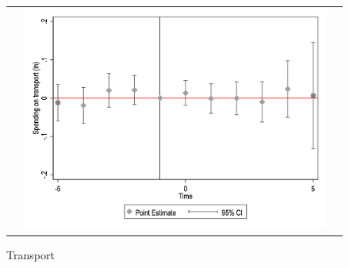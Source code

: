 \begin{figure}[!ht]
\begin{tabular}{@{}ccc@{}}
\begin{minipage}[t]{0.32\textwidth}
            \label{fig:cassport}
        \end{minipage} &
        \begin{minipage}[t]{0.32\textwidth}
            \centering
            \caption{Transport}
            \includegraphics[width=\linewidth]{images/pop_10000/caseventdd_ln_q4_08_step1.jpg}
            \label{fig:castransport}
        \end{minipage} \\[10pt]


\end{tabular}
\end{figure}
